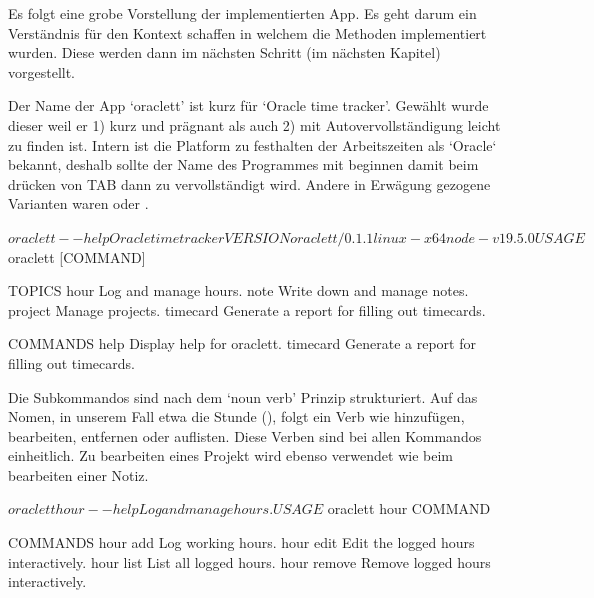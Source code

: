 \documentclass[oneside,bibliography=totocnumbered,BCOR=5mm]{scrbook}
\newenvironment{code}{\captionsetup{type=listing, skip=0pt}}{}
\begin{document}

Es folgt eine grobe Vorstellung der implementierten App. Es geht darum ein
Verständnis für den Kontext schaffen in welchem die Methoden implementiert
wurden. Diese werden dann im nächsten Schritt (im nächsten Kapitel) vorgestellt.

Der Name der App `oraclett' ist kurz für `Oracle time tracker'. Gewählt wurde
dieser weil er 1) kurz und prägnant als auch 2) mit Autovervollständigung leicht
zu finden ist. Intern ist die Platform zu festhalten der Arbeitszeiten als
`Oracle` bekannt, deshalb sollte der Name des Programmes mit 
beginnen damit beim drücken von TAB dann zu 
vervollständigt wird. Andere in Erwägung gezogene Varianten waren
 oder .

\begin{code}
  \medskip
  \label{code:oraclett-help}
  \begin{shellcode}
$ oraclett --help
Oracle time tracker

VERSION
  oraclett/0.1.1 linux-x64 node-v19.5.0

USAGE
  $ oraclett [COMMAND]

TOPICS
  hour      Log and manage hours.
  note      Write down and manage notes.
  project   Manage projects.
  timecard  Generate a report for filling out timecards.

COMMANDS
  help      Display help for oraclett.
  timecard  Generate a report for filling out timecards.
  \end{shellcode}
\end{code}

\label{text:noun-verb} Die Subkommandos sind nach dem `noun verb' Prinzip
\parencite{clig} strukturiert. Auf das Nomen, in unserem Fall etwa die Stunde
(), folgt ein Verb wie hinzufügen, bearbeiten, entfernen oder
auflisten. Diese Verben sind bei allen Kommandos einheitlich. Zu bearbeiten
eines Projekt wird ebenso  verwendet wie beim bearbeiten einer
Notiz.

\begin{code}
  \label{code:hours-help}
  \begin{shellcode}
$ oraclett hour --help
Log and manage hours.

USAGE
  $ oraclett hour COMMAND

COMMANDS
  hour add     Log working hours.
  hour edit    Edit the logged hours interactively.
  hour list    List all logged hours.
  hour remove  Remove logged hours interactively.
  \end{shellcode}
  \medskip
\end{code}
\end{document}
